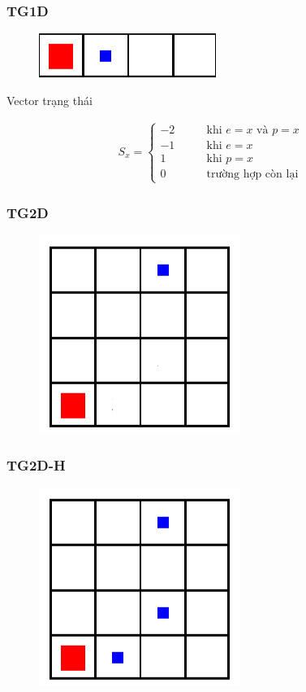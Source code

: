 \documentclass{beamer}
\begin{document}
\begin{frame}
\frametitle{TG1D}
\begin{figure}[h]
    \centering
    \includegraphics{photo/TG1D.png}
\end{figure}
\begin{block}{Vector trạng thái}
\begin{center}
\begin{align*}
S_x=\begin{cases}
-2\quad \quad &\text{khi $e=x$ và $p=x$}\\
-1\quad \quad &\text{khi $e=x$}\\
1 \quad \quad &\text{khi $p=x$}\\
0 \quad \quad &\text{trường hợp còn lại}
\end{cases}
\end{align*}
\end{center}
\end{block}
\end{frame}

\begin{frame}
\frametitle{TG2D}
\begin{figure}[h]
    \centering
    \includegraphics{photo/TG2D.png}
\end{figure}
\end{frame}

\begin{frame}
\frametitle{TG2D-H}
\begin{figure}[h]
    \centering
    \includegraphics{photo/TG2D_H.png}
\end{figure}
\end{frame}
\end{document}
